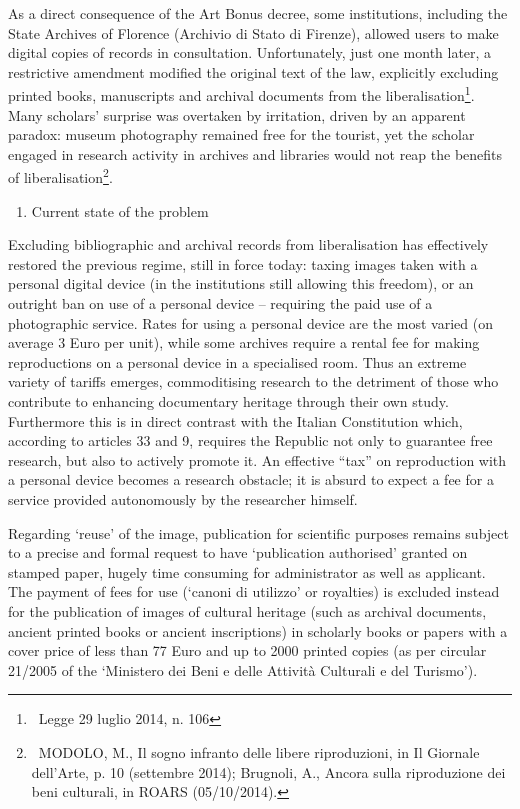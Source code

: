 \documentclass[amsthm,ebook]{saparticle}
\begin{document}
As a direct consequence of the Art Bonus decree, some institutions, including the State Archives of Florence (Archivio
di Stato di Firenze), allowed users to make digital copies of records in consultation. Unfortunately, just one month
later, a restrictive amendment modified the original text of the law, explicitly excluding printed books, manuscripts
and archival documents from the liberalisation\footnote{\ Legge 29 luglio 2014, n. 106}. Many scholars’ surprise was
overtaken by irritation, driven by an apparent paradox: museum photography remained free for the tourist, yet the
scholar engaged in research activity in archives and libraries would not reap the benefits of
liberalisation\footnote{\ MODOLO, M., Il sogno infranto delle libere riproduzioni, in Il Giornale dell’Arte, p. 10
(settembre 2014); Brugnoli, A., Ancora sulla riproduzione dei beni culturali, in ROARS (05/10/2014).\par }.




\begin{enumerate}
\item Current state of the problem
\end{enumerate}
Excluding bibliographic and archival records from liberalisation has effectively restored the previous regime, still in
force today: taxing images taken with a personal digital device (in the institutions still allowing this freedom), or
an outright ban on use of a personal device – requiring the paid use of a photographic service. Rates for using a
personal device are the most varied (on average 3 Euro per unit), while some archives require a rental fee for making
reproductions on a personal device in a specialised room. Thus an extreme variety of tariffs emerges, commoditising
research to the detriment of those who contribute to enhancing documentary heritage through their own study.
Furthermore this is in direct contrast with the Italian Constitution which, according to articles 33 and 9, requires
the Republic not only to guarantee free research, but also to actively promote it. An effective “tax” on reproduction
with a personal device becomes a research obstacle; it is absurd to expect a fee for a service provided autonomously by
the researcher himself. 

Regarding ‘reuse’ of the image, publication for scientific purposes remains subject to a precise and formal request to
have ‘publication authorised’ granted on stamped paper, hugely time consuming for administrator as well as applicant.
The payment of fees for use (‘canoni di utilizzo’ or royalties) is excluded instead for the publication of images of
cultural heritage (such as archival documents, ancient printed books or ancient inscriptions) in scholarly books or
papers with a cover price of less than 77 Euro and up to 2000 printed copies (as per circular 21/2005 of the ‘Ministero
dei Beni e delle Attività Culturali e del Turismo’).
\end{document}
